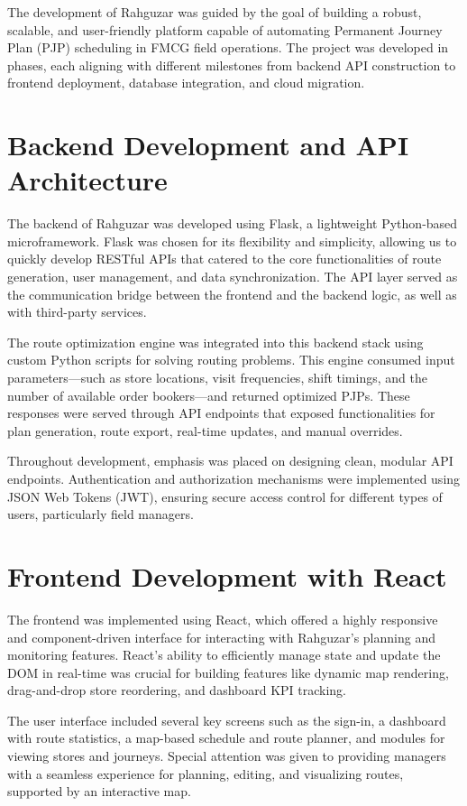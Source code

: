 The development of Rahguzar was guided by the goal of building a robust, scalable, and user-friendly platform capable of automating Permanent Journey Plan (PJP) scheduling in FMCG field operations. The project was developed in phases, each aligning with different milestones from backend API construction to frontend deployment, database integration, and cloud migration.

\section{Backend Development and API Architecture}
The backend of Rahguzar was developed using Flask, a lightweight Python-based microframework. Flask was chosen for its flexibility and simplicity, allowing us to quickly develop RESTful APIs that catered to the core functionalities of route generation, user management, and data synchronization. The API layer served as the communication bridge between the frontend and the backend logic, as well as with third-party services.

The route optimization engine was integrated into this backend stack using custom Python scripts for solving routing problems. This engine consumed input parameters—such as store locations, visit frequencies, shift timings, and the number of available order bookers—and returned optimized PJPs. These responses were served through API endpoints that exposed functionalities for plan generation, route export, real-time updates, and manual overrides.

Throughout development, emphasis was placed on designing clean, modular API endpoints. Authentication and authorization mechanisms were implemented using JSON Web Tokens (JWT), ensuring secure access control for different types of users, particularly field managers.

\section{Frontend Development with React}
The frontend was implemented using React, which offered a highly responsive and component-driven interface for interacting with Rahguzar's planning and monitoring features. React’s ability to efficiently manage state and update the DOM in real-time was crucial for building features like dynamic map rendering, drag-and-drop store reordering, and dashboard KPI tracking.

The user interface included several key screens such as the sign-in, a dashboard with route statistics, a map-based schedule and route planner, and modules for viewing stores and journeys. Special attention was given to providing managers with a seamless experience for planning, editing, and visualizing routes, supported by an interactive map.

